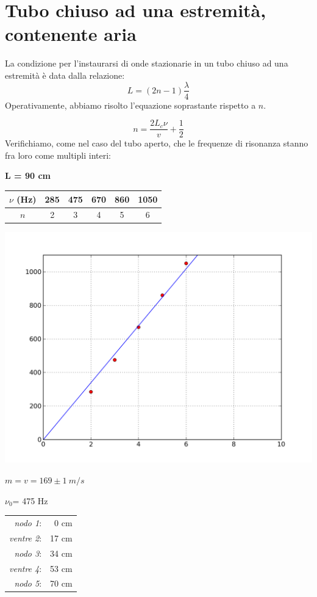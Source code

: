 \section{Tubo chiuso ad una estremità, contenente aria}

La condizione per l'instaurarsi di onde stazionarie in un tubo chiuso ad una estremità è data dalla relazione:
\\
\begin{equation}
 L=(2n-1)\frac{\lambda}{4}
\end{equation}
Operativamente, abbiamo risolto l'equazione soprastante rispetto a $n$.

$$ n = \frac{2L_c\nu}{v} + \frac{1}{2} $$
Verifichiamo, come nel caso del tubo aperto, che le frequenze di risonanza stanno fra loro come multipli interi: 

\textbf{L = 90 cm}
\\
\begin{center}
\begin{tabular}{c|c|c|c|c|c}
$\nu$ (Hz) & 285 & 475 & 670 & 860 & 1050 \\
\midrule
$n$ & 2 & 3 & 4 & 5 & 6 \\
\end{tabular}
\end{center}


\begin{center}
\includegraphics[scale=0.5]{../grafici/tubo/tubo2.png}

$m = v = 169\pm 1\ m/s$
\end{center}

\begin{center}
$\nu_0$= 475 Hz\\
\begin{tabular}{r r}
\textit{nodo 1}: & 0 cm\\
\textit{ventre 2}: & 17 cm\\
\textit{nodo 3}: & 34 cm\\
\textit{ventre 4}: & 53 cm\\
\textit{nodo 5}: & 70 cm\\
\end{tabular}
\end{center}

